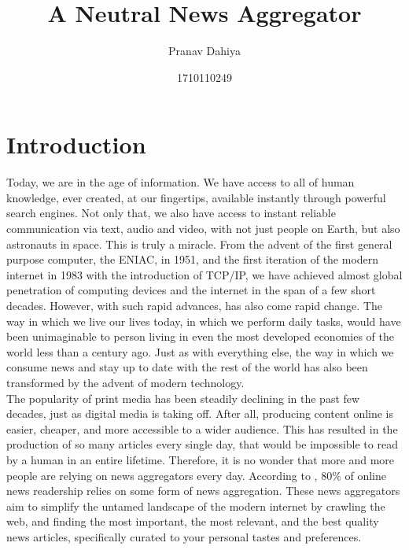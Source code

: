 \documentclass[12pt]{article}
\title{A Neutral News Aggregator}
\author{Pranav Dahiya}
\date{1710110249}
\begin{document}
\maketitle

\section{Introduction}
\label{sec:introduction}

Today, we are in the age of information. We have access to all of human knowledge, ever created, at our fingertips, available instantly through powerful search engines. Not only that, we also have access to instant reliable communication via text, audio and video, with not just people on Earth, but also astronauts in space. This is truly a miracle. From the advent of the first general purpose computer, the ENIAC, in 1951, and the first iteration of the modern internet in 1983 with the introduction of TCP/IP, we have achieved almost global penetration of computing devices and the internet in the span of a few short decades. However, with such rapid advances, has also come rapid change. The way in which we live our lives today, in which we perform daily tasks, would have been unimaginable to person living in even the most developed economies of the world less than a century ago. Just as with everything else, the way in which we consume news and stay up to date with the rest of the world has also been transformed by the advent of modern technology.\\

The popularity of print media has been steadily declining in the past few decades, just as digital media is taking off. After all, producing content online is easier, cheaper, and more accessible to a wider audience. This has resulted in the production of so many articles every single day, that would be impossible to read by a human in an entire lifetime. Therefore, it is no wonder that more and more people are relying on news aggregators every day. According to \cite{doh-shin16}, 80\% of online news readership relies on some form of news aggregation. These news aggregators aim to simplify the untamed landscape of the modern internet by crawling the web, and finding the most important, the most relevant, and the best quality news articles, specifically curated to your personal tastes and preferences.\\
\end{document}
